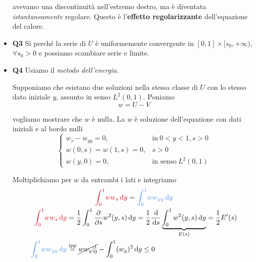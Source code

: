 \documentclass[10pt,a4paper,twoside,openright]{book}
\newcommand{\de}{\,\mathrm d}
\newcommand{\dy}{\de y}
\newcommand{\ds}{\de s}
\begin{document}
\begin{itemize}
avevamo una discontinuità nell'estremo destro, ma è diventata \textit{istantaneamente} regolare. Questo è l'\textbf{effetto regolarizzante} dell'equazione del calore.
\item \textbf{Q3} Sì perché la serie di $U$ è uniformemente convergente in $[ 0,1] \times [ s_{0},+\infty)$, $\forall s_{0}  >0$ e possiamo scambiare serie e limite.
\item \textbf{Q4} Usiamo il \textit{metodo dell'energia.}

Supponiamo che esistano due soluzioni nella stessa classe di $U$ con lo stesso dato iniziale $y$, assunto in senso $L^{2}(0,1)$. Poniamo
\begin{equation*}
w=U-V
\end{equation*}

vogliamo mostrare che $w$ è nulla. La $w$ è soluzione dell'equazione con dati iniziali e al bordo nulli
\begin{equation*}
\begin{cases}
w_{s} -w_{yy} =0, & \text{in} \ 0< y< 1,s >0\\
w(0,s) =w(1,s) =0, & \boxed{s >0}\\
w(y,0) =0, & \text{in senso} \ L^{2}(0,1)
\end{cases}
\end{equation*}

 Moltiplichiamo per $w$ da entrambi i lati e integriamo
 \begin{gather*}
\textcolor[rgb]{0.82,0.01,0.11}{\int ^{1}_{0}}\textcolor[rgb]{0.82,0.01,0.11}{ww}\textcolor[rgb]{0.82,0.01,0.11}{_{s}}\textcolor[rgb]{0.82,0.01,0.11}{\dy} =\textcolor[rgb]{0.29,0.56,0.89}{\int ^{1}_{0}}\textcolor[rgb]{0.29,0.56,0.89}{ww}\textcolor[rgb]{0.29,0.56,0.89}{_{yy}}\textcolor[rgb]{0.29,0.56,0.89}{\dy}\\
\begin{aligned}
\textcolor[rgb]{0.82,0.01,0.11}{\int ^{1}_{0}}\textcolor[rgb]{0.82,0.01,0.11}{ww}\textcolor[rgb]{0.82,0.01,0.11}{_{s}}\textcolor[rgb]{0.82,0.01,0.11}{\dy} & =\frac{1}{2}\int ^{1}_{0}\frac{\partial }{\partial s} w^{2}(y,s) \dy=\frac{1}{2}\frac{\de}{\ds}\underbrace{\int ^{1}_{0} w^{2}(y,s) \dy}_{E(s)} =\frac{1}{2} E'(s)\\
\textcolor[rgb]{0.29,0.56,0.89}{\int ^{1}_{0}}\textcolor[rgb]{0.29,0.56,0.89}{ww}\textcolor[rgb]{0.29,0.56,0.89}{_{yy}}\textcolor[rgb]{0.29,0.56,0.89}{\dy} & \overset{\text{ipp}}{=}\cancel{ww_{y} |^{1}_{0}} -\int ^{1}_{0}(w_{y})^{2} \dy\leqslant 0
\end{aligned}
\end{gather*}


\end{itemize}
\end{document}
